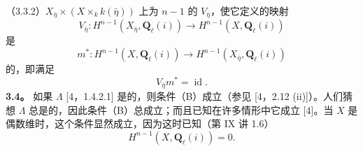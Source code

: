\noindent（3.3.2）$X_{\bar\eta}\times(X\times_k k(\bar\eta))$ 上为 $n-1$ 的 $V_{\bar\eta}$，使它定义的映射
\begin{equation}\tag{3.3.3}
V_{\bar\eta}:H^{n-1}(X_{\bar\eta},\mathbf Q_\ell(i))\longrightarrow H^{n-1}(X,\mathbf Q_\ell(i))
\end{equation}
是
\begin{equation}\tag{3.3.4}
m^*:H^{n-1}(X,\mathbf Q_\ell(i))\longrightarrow H^{n-1}(X_{\bar\eta},\mathbf Q_\ell(i))
\end{equation}
的，即满足
\begin{equation}\tag{3.3.5}
V_{\bar\eta}m^*=\operatorname{id}.
\end{equation}
\textbf{3.4。} 如果 $\Lambda$ [4，1.4.2.1] 是的，则条件（B）成立（参见 [4，2.12 (ii)]）。人们猜想 $\Lambda$ 总是的，因此条件（B）总成立；而且已知在许多情形中它成立 [4]。当 $X$ 是偶数维时，这个条件显然成立，因为这时已知（第 IX 讲 1.6）
\begin{equation}\tag{3.4.1}
H^{n-1}(X,\mathbf Q_\ell(i))=0.
\end{equation}

